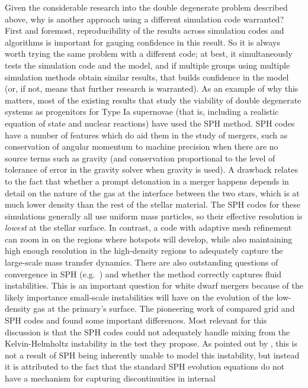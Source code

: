\documentclass[12pt]{article}
\begin{document}
Given the considerable research into the double degenerate problem 
described above, why is another approach using a different simulation
code warranted? First and foremost, reproducibility of the results
across simulation codes and algorithms is important for gauging
confidence in this result. So it is always worth trying the same
problem with a different code; at best, it simultaneously tests the
simulation code and the model, and if multiple groups using multiple
simulation methods obtain similar results, that builds confidence
in the model (or, if not, means that further research is warranted).
As an example of why this matters, most of the existing results that study 
the viability of double degenerate systems as progenitors for
Type Ia supernovae (that is, including a realistic equation of state
and nuclear reactions) have used the SPH method. SPH codes have a
number of features which do aid them in the study of mergers, such
as conservation of angular momentum to machine precision when there
are no source terms such as gravity (and conservation proportional
to the level of tolerance of error in the gravity solver when gravity
is used). A drawback relates to the fact that whether a prompt detonation
in a merger happens depends in detail on the nature of the
gas at the interface between the two stars, which is at much lower
density than the rest of the stellar material. The SPH codes for these
simulations generally all use uniform mass particles, so their
effective resolution is \textit{lowest} at the stellar surface. In
contrast, a code with adaptive mesh refinement can zoom in on the regions
where hotspots will develop, while also maintaining high enough resolution
in the high-density regions to adequately capture the large-scale mass
transfer dynamics. There are also outstanding questions of convergence
in SPH (e.g.\ \citealt{zhu-SPH:2014}) and whether the method
correctly captures fluid instabilities. This is an important question
for white dwarf mergers because of the likely importance small-scale
instabilities will have on the evolution of the low-density gas at the
primary's surface. The pioneering work of \cite{agertz:2007} compared
grid and SPH codes and found some important differences. Most relevant
for this discussion is that the SPH codes could not adequately handle
mixing from the Kelvin-Helmholtz instability in the test they
propose. As pointed out by \cite{price:2008}, this is not a result of
SPH being inherently unable to model this instability, but instead it
is attributed to the fact that the standard SPH evolution equations do
not have a mechanism for capturing discontinuities in internal
\end{document}
